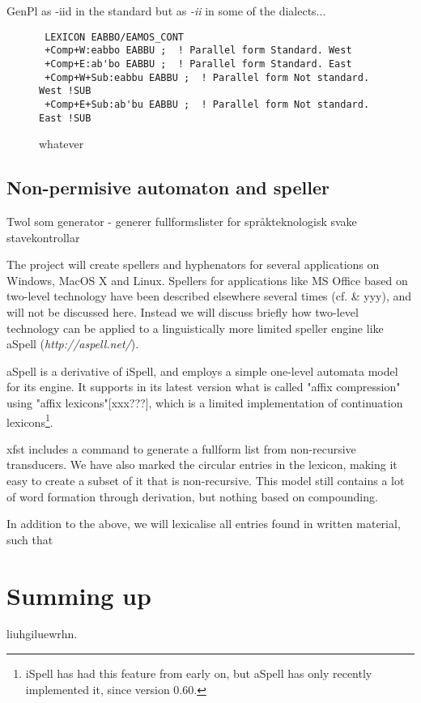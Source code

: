 \documentclass[a4paper,english]{article}
\begin{document}
GenPl as -iid in the standard but as \textit{-ii}
 in some of the dialects...

\begin{figure}[htbp]
\caption{whatever}
\begin{center}
\begin{verbatim}
 LEXICON EABBO/EAMOS_CONT
 +Comp+W:eabbo EABBU ;  ! Parallel form Standard. West
 +Comp+E:ab'bo EABBU ;  ! Parallel form Standard. East
 +Comp+W+Sub:eabbu EABBU ;  ! Parallel form Not standard. West !SUB
 +Comp+E+Sub:ab'bu EABBU ;  ! Parallel form Not standard. East !SUB
\end{verbatim}
\label{EWadjcomp}
\end{center}
\end{figure}

\subsection{Non-permisive automaton and speller}

Twol som generator - generer fullformslister for språkteknologisk svake stavekontrollar

The project will create spellers and hyphenators for several applications on Windows, MacOS X and Linux. Spellers for applications like MS Office based on two-level technology have been described elsewhere several times (cf. \cite{Arppe02} \& yyy), and will not be discussed here. Instead we will discuss briefly how two-level technology can be applied to a linguistically more limited speller engine like aSpell (\textit{http://aspell.net/}).

aSpell is a derivative of iSpell, and employs a simple one-level automata model for its engine. It supports in its latest version what is called "affix compression" using "affix lexicons"[xxx???], which is a limited implementation of continuation lexicons\footnote{iSpell has had this feature from early on, but aSpell has only recently implemented it, since version 0.60.}.

xfst includes a command to generate a fullform list from non-recursive transducers. We have also marked the circular entries in the lexicon, making it easy to create a subset of it that is non-recursive. This model still contains a lot of word formation through derivation, but nothing based on compounding.

In addition  to the above, we will lexicalise all entries found in written material, such that

\section{Summing up}

liuhgiluewrhn.

 



\end{document}
